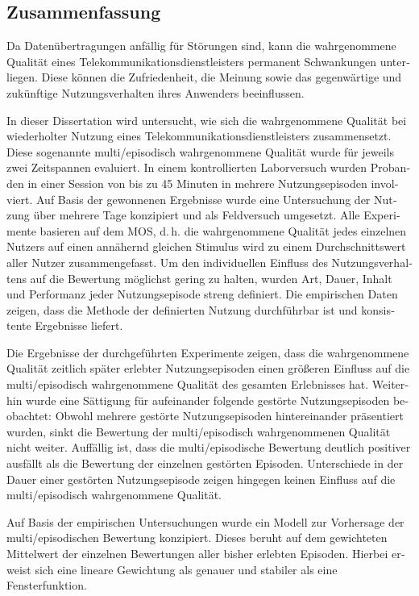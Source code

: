 \begin{otherlanguage}{ngerman}
{\let\cleardoublepage\relax \chapter*{Zusammenfassung}}
Da Datenübertragungen anfällig für Störungen sind, kann die wahrgenommene Qualität eines Telekommunikationsdienstleisters permanent Schwankungen unterliegen.
Diese können die Zufriedenheit, die Meinung sowie das gegenwärtige und zukünftige Nutzungsverhalten ihres Anwenders beeinflussen. 

In dieser Dissertation wird untersucht, wie sich die wahrgenommene Qualität bei wiederholter Nutzung eines Telekommunikationsdienstleisters zusammensetzt.
Diese sogenannte multi\-/episodisch wahrgenommene Qualität wurde für jeweils zwei Zeitspannen evaluiert.
In einem kontrollierten Laborversuch wurden Probanden in einer Session von bis zu 45 Minuten in mehrere Nutzungsepisoden involviert.
Auf Basis der gewonnenen Ergebnisse wurde eine Untersuchung der Nutzung über mehrere Tage konzipiert und als Feldversuch umgesetzt.
Alle Experimente basieren auf dem \acf{MOS}, d.\,h. die wahrgenommene Qualität jedes einzelnen Nutzers auf einen annähernd gleichen Stimulus wird zu einem Durchschnittswert aller Nutzer zusammengefasst. 
Um den individuellen Einfluss des Nutzungsverhaltens auf die Bewertung möglichst gering zu halten, wurden Art, Dauer, Inhalt und Performanz jeder Nutzungsepisode streng definiert.
Die empirischen Daten zeigen, dass die Methode der definierten Nutzung durchführbar ist und konsistente Ergebnisse liefert.

Die Ergebnisse der durchgeführten Experimente zeigen, dass die wahrgenommene Qualität zeitlich später erlebter Nutzungsepisoden einen größeren Einfluss auf die multi\-/episodisch wahrgenommene Qualität des gesamten Erlebnisses hat.
Weiterhin wurde eine Sättigung für aufeinander folgende gestörte Nutzungsepisoden beobachtet: Obwohl mehrere gestörte Nutzungsepisoden hintereinander präsentiert wurden, sinkt die Bewertung der multi\-/episodisch wahrgenommenen Qualität nicht weiter.
Auffällig ist, dass die multi\-/episodische Bewertung deutlich positiver ausfällt als die Bewertung der einzelnen gestörten Episoden.
Unterschiede in der Dauer einer gestörten Nutzungsepisode zeigen hingegen keinen Einfluss auf die multi\-/episodisch wahrgenommene Qualität. 


Auf Basis der empirischen Untersuchungen wurde ein Modell zur Vorhersage der multi\-/episodischen Bewertung konzipiert.
Dieses beruht auf dem gewichteten Mittelwert der einzelnen Bewertungen aller bisher erlebten Episoden.
Hierbei erweist sich eine lineare Gewichtung als genauer und stabiler als eine Fensterfunktion. 

\end{otherlanguage}

